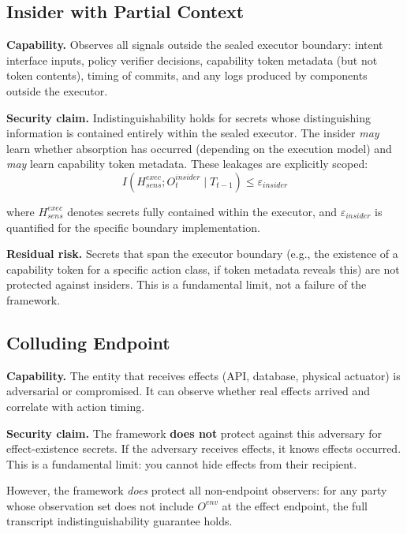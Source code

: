 \documentclass[11pt,a4paper]{article}
\begin{document}
\subsection{Insider with Partial Context}

\textbf{Capability.} Observes all signals outside the sealed executor boundary: intent interface inputs, policy verifier decisions, capability token metadata (but not token contents), timing of commits, and any logs produced by components outside the executor.

\textbf{Security claim.} Indistinguishability holds for secrets whose distinguishing information is contained entirely within the sealed executor. The insider \textit{may} learn whether absorption has occurred (depending on the execution model) and \textit{may} learn capability token metadata. These leakages are explicitly scoped:
\begin{equation}
I(H_{sens}^{exec}; O^{insider}_t \mid T_{t-1}) \le \varepsilon_{insider}
\end{equation}

where $H_{sens}^{exec}$ denotes secrets fully contained within the executor, and $\varepsilon_{insider}$ is quantified for the specific boundary implementation.

\textbf{Residual risk.} Secrets that span the executor boundary (e.g., the existence of a capability token for a specific action class, if token metadata reveals this) are not protected against insiders. This is a fundamental limit, not a failure of the framework.

\subsection{Colluding Endpoint}

\textbf{Capability.} The entity that receives effects (API, database, physical actuator) is adversarial or compromised. It can observe whether real effects arrived and correlate with action timing.

\textbf{Security claim.} The framework \textbf{does not} protect against this adversary for effect-existence secrets. If the adversary receives effects, it knows effects occurred. This is a fundamental limit: you cannot hide effects from their recipient.

However, the framework \textit{does} protect all non-endpoint observers: for any party whose observation set does not include $O^{env}$ at the effect endpoint, the full transcript indistinguishability guarantee holds.
\end{document}
